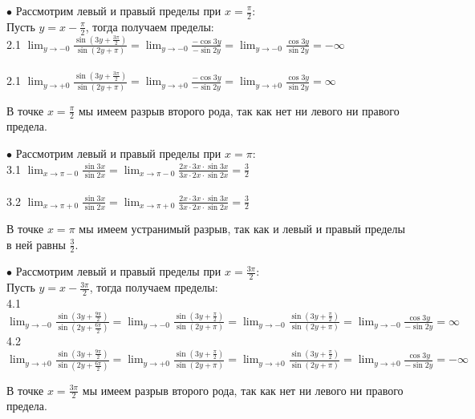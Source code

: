\documentclass[a4paper, 12pt]{article}
\begin{document}
    \par $\bullet$ Рассмотрим левый и правый пределы при $x = \frac{\pi}{2}$:
    \\ Пусть $y = x - \frac{\pi}{2}$, тогда получаем пределы: 
    \\ 2.1 $\lim_{y \to - 0} \frac{\sin (3y + \frac{3\pi}{2})}{\sin (2y + \pi)} = \lim_{y \to - 0} \frac{-\cos 3y}{-\sin 2y} = \lim_{y \to - 0} \frac{\cos 3y}{\sin 2y} = -\infty$
    \\
    \\ 2.1 $\lim_{y \to + 0} \frac{\sin (3y + \frac{3\pi}{2})}{\sin (2y + \pi)} = \lim_{y \to + 0} \frac{-\cos 3y}{-\sin 2y} = \lim_{y \to + 0} \frac{\cos 3y}{\sin 2y} = \infty$
    \par В точке $x = \frac{\pi}{2}$ мы имеем разрыв второго рода, так как нет ни левого ни правого предела.
    \\
    \par $\bullet$ Рассмотрим левый и правый пределы при $x = \pi$:
    \\ 3.1 $\lim_{x \to \pi - 0} \frac{\sin 3x}{\sin 2x} = \lim_{x \to \pi - 0} \frac{2x \cdot 3x \cdot \sin 3x}{3x \cdot 2x \cdot \sin 2x} = \frac{3}{2}$
    \\
    \\ 3.2 $\lim_{x \to \pi + 0} \frac{\sin 3x}{\sin 2x} = \lim_{x \to \pi + 0} \frac{2x \cdot 3x \cdot \sin 3x}{3x \cdot 2x \cdot \sin 2x} = \frac{3}{2}$
    \par В точке $x = \pi$ мы имеем устранимый разрыв, так как и левый и правый пределы в ней равны $\frac{3}{2}$.
    \\
    \par $\bullet$ Рассмотрим левый и правый пределы при $x = \frac{3 \pi}{2}$:
    \\ Пусть $y = x - \frac{3\pi}{2}$, тогда получаем пределы: 
    \\ 4.1 $\lim_{y \to - 0} \frac{\sin (3y + \frac{9\pi}{2})}{\sin (2y + \frac{6\pi}{2})} = \lim_{y \to - 0} \frac{\sin (3y + \frac{\pi}{2})}{\sin (2y + \pi)} = \lim_{y \to - 0} \frac{\sin (3y + \frac{\pi}{2})}{\sin (2y + \pi)} = \lim_{y \to - 0} \frac{\cos 3y}{-\sin 2y} = \infty$
    \\ 4.2 $\lim_{y \to + 0} \frac{\sin (3y + \frac{9\pi}{2})}{\sin (2y + \frac{6\pi}{2})} = \lim_{y \to + 0} \frac{\sin (3y + \frac{\pi}{2})}{\sin (2y + \pi)} = \lim_{y \to + 0} \frac{\sin (3y + \frac{\pi}{2})}{\sin (2y + \pi)} = \lim_{y \to + 0} \frac{\cos 3y}{-\sin 2y} = -\infty$
    \par В точке $x = \frac{3\pi}{2}$ мы имеем разрыв второго рода, так как нет ни левого ни правого предела.
\end{document}
